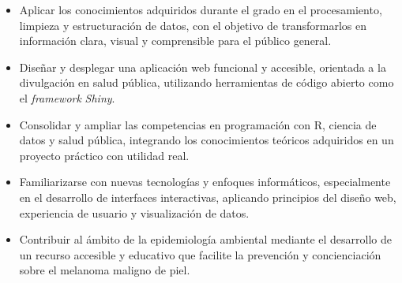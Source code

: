 \begin{itemize}
    \item Aplicar los conocimientos adquiridos durante el grado en el procesamiento, limpieza y estructuración de datos, con el objetivo de transformarlos en información clara, visual y comprensible para el público general.

    \item Diseñar y desplegar una aplicación web funcional y accesible, orientada a la divulgación en salud pública, utilizando herramientas de código abierto como el \textit{framework} \textit{Shiny}.

    \item Consolidar y ampliar las competencias en programación con R, ciencia de datos y salud pública, integrando los conocimientos teóricos adquiridos en un proyecto práctico con utilidad real.

    \item Familiarizarse con nuevas tecnologías y enfoques informáticos, especialmente en el desarrollo de interfaces interactivas, aplicando principios del diseño web, experiencia de usuario y visualización de datos.

    \item Contribuir al ámbito de la epidemiología ambiental mediante el desarrollo de un recurso accesible y educativo que facilite la prevención y concienciación sobre el melanoma maligno de piel.
\end{itemize}







